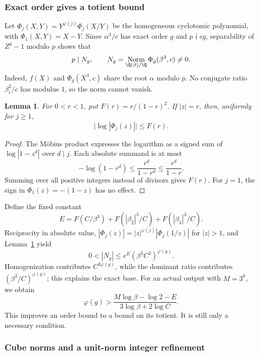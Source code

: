 \documentclass[11pt,a4paper]{article}
\newtheorem{lemma}[theorem]{Lemma}\newtheorem{proposition}[theorem]{Proposition}
\theoremstyle{definition}\newtheorem{definition}[theorem]{Definition}
\theoremstyle{remark}\newtheorem{remark}[theorem]{Remark}
\DeclareMathOperator{\Norm}{Norm}\DeclareMathOperator{\ord}{ord}\DeclareMathOperator{\Gal}{Gal}
\begin{document}
\subsubsection{Exact order gives a totient bound}

Let $\Phi_j(X,Y)=Y^{\varphi(j)}\Phi_j(X/Y)$ be the homogeneous
cyclotomic polynomial, with $\Phi_1(X,Y)=X-Y$.
Since $\alpha^3/c$ has exact order $g$ and $p\nmid cg$, separability of
$Z^g-1$ modulo $p$ shows that
\begin{equation}\label{R16:eq:cyclonorm}
 p\mid N_g,\qquad
 N_g=\Norm_{\Q(\beta)/\Q}\Phi_g(\beta^3,c)\ne0.
\end{equation}
Indeed, $f(X)$ and $\Phi_g(X^3,c)$ share the root $\alpha$ modulo $p$.
No conjugate ratio $\beta_i^3/c$ has modulus $1$, so the norm cannot
vanish.

\begin{lemma}\label{R16:lem:cyclobound}
For $0<r<1$, put $F(r)=r/(1-r)^2$. If $|z|=r$, then, uniformly for
$j\ge1$,
\[
 \bigl|\log|\Phi_j(z)|\bigr|\le F(r).
\]
\end{lemma}
\begin{proof}
The M\"obius product expresses the logarithm as a signed sum of
$\log|1-z^d|$ over $d\mid j$. Each absolute summand is at most
\[
 -\log(1-r^d)\le\frac{r^d}{1-r^d}\le\frac{r^d}{1-r}.
\]
Summing over all positive integers instead of divisors gives $F(r)$.
For $j=1$, the sign in $\Phi_1(z)=-(1-z)$ has no effect.
\end{proof}

Define the fixed constant
\[
 E=F(C/\beta^3)+F(|\beta_2|^3/C)+F(|\beta_3|^3/C).
\]
Reciprocity in absolute value,
$|\Phi_j(z)|=|z|^{\varphi(j)}|\Phi_j(1/z)|$ for $|z|>1$,
and Lemma~\ref{R16:lem:cyclobound} yield
\[
 0<|N_g|\le e^E(\beta^3C^2)^{\varphi(g)}.
\]
Homogenization contributes $C^{3\varphi(g)}$, while the dominant ratio
contributes $(\beta^3/C)^{\varphi(g)}$; this explains the exact base.
For an actual output with $M=3^k$, we obtain
\begin{equation}\label{R16:eq:totientgeneral}
 \varphi(g)>\frac{M\log\beta-\log2-E}{3\log\beta+2\log C}.
\end{equation}
This improves an order bound to a bound on its totient. It is still only a
necessary condition.

\subsubsection{Cube norms and a unit-norm integer refinement}
\end{document}
